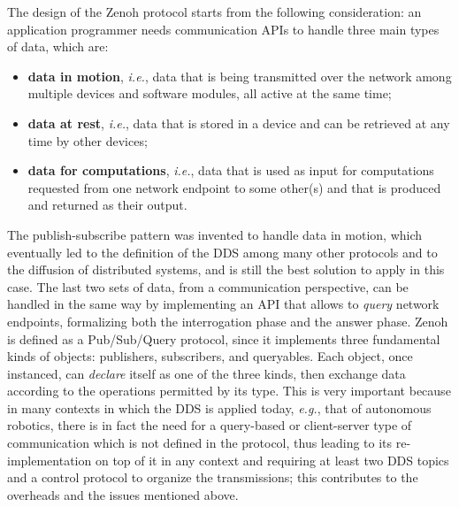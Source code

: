 The design of the Zenoh protocol starts from the following consideration: an application programmer needs communication APIs to handle three main types of data, which are:
\begin{itemize}
  \item \textbf{data in motion}, \emph{i.e.}, data that is being transmitted over the network among multiple devices and software modules, all active at the same time;
  \item \textbf{data at rest}, \emph{i.e.}, data that is stored in a device and can be retrieved at any time by other devices;
  \item \textbf{data for computations}, \emph{i.e.}, data that is used as input for computations requested from one network endpoint to some other(s) and that is produced and returned as their output.
\end{itemize}
The publish-subscribe pattern was invented to handle data in motion, which eventually led to the definition of the DDS among many other protocols and to the diffusion of distributed systems, and is still the best solution to apply in this case. The last two sets of data, from a communication perspective, can be handled in the same way by implementing an API that allows to \emph{query} network endpoints, formalizing both the interrogation phase and the answer phase. Zenoh is defined as a Pub/Sub/Query protocol, since it implements three fundamental kinds of objects: publishers, subscribers, and queryables. Each object, once instanced, can \emph{declare} itself as one of the three kinds, then exchange data according to the operations permitted by its type. This is very important because in many contexts in which the DDS is applied today, \emph{e.g.}, that of autonomous robotics, there is in fact the need for a query-based or client-server type of communication which is not defined in the protocol, thus leading to its re-implementation on top of it in any context and requiring at least two DDS topics and a control protocol to organize the transmissions; this contributes to the overheads and the issues mentioned above.

